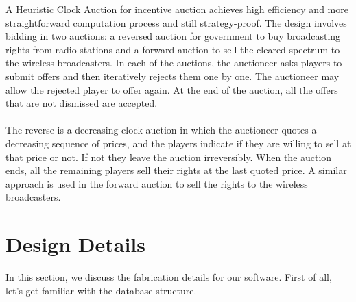 \documentclass[a4paper]{article}
\begin{document}
A Heuristic Clock Auction for incentive auction achieves high efficiency and more straightforward computation process and still strategy-proof. The design involves bidding in two auctions: a reversed auction for government to buy broadcasting rights from radio stations and a forward auction to sell the cleared spectrum to the wireless broadcasters. In each of the auctions, the auctioneer asks players to submit offers and then iteratively rejects them one by one. The auctioneer may allow the rejected player to offer again. At the end of the auction, all the offers that are not dismissed are accepted.
\\\\
The reverse is a decreasing clock auction in which the auctioneer quotes a decreasing sequence of prices, and the players indicate if they are willing to sell at that price or not. If not they leave the auction irreversibly. When the auction ends, all the remaining players sell their rights at the last quoted price. A similar approach is used in the forward auction to sell the rights to the wireless broadcasters.



\pagebreak
\section*{Design Details}
In this section, we discuss the fabrication details for our software. 
First of all, let's get familiar with the database structure.
\end{document}
